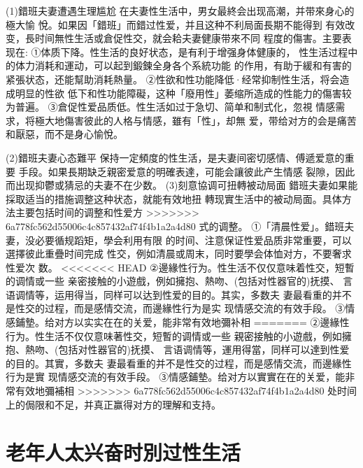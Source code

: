 \documentclass[12pt,UTF8]{ctexbook}
\begin{document}
(1)錯班夫妻遭遇生理尴尬
在夫妻性生活中，男女最終会出现高潮，并带來身心的極大愉
悅。如果因「錯班」而錯过性爱，并且这种不利局面長期不能得到
有效改变，長时间無性生活或倉促性交，就会耠夫妻健康带來不同
程度的傷害。主要表现在:
①体质下降。性生活的良好状态，是有利于增强身体健康的，
性生活过程中的体力消耗和運动，可以起到鍛鍊全身各个系統功能
的作用，有助于緩和有害的紧張状态，还能幫助消耗熱量。
②性欲和性功能降低·经常抑制性生活，将会造成明显的性欲
低下和性功能障礙，这种「廢用性」萎缩所造成的性能力的傷害较
为普遍。
③倉促性爱品质低。性生活如过于急切、简单和制式化，忽視
情感需求，将極大地傷害彼此的人格与情感，雖有「性」，却無
爱，带给对方的会是痛苦和厭惡，而不是身心愉悅。

(2)錯班夫妻心态難平
保持一定頻度的性生活，是夫妻间密切感情、傅遞爱意的重要
手段。如果長期缺乏親密爱意的明確表達，可能会讓彼此产生情感
裂隙，因此而出现抑鬱或猜忌的夫妻不在少数。
(3)刻意協调可扭轉被动局面
錯班夫妻如果能採取适当的措施调整这种状态，就能有效地扭
轉现實生活中的被动局面。具体方法主要包括时间的调整和性爱方
>>>>>>> 6a778fc562d55006c4c857432af74f4b1a2a4d80
式的调整。
①「清晨性爱」。錯班夫妻，没必要循规蹈矩，學会利用有限
的时间、注意保证性爱品质非常重要，可以選擇彼此重疊时间完成
性交，例如清晨或周末，同时要學会体恤对方，不要奢求性爱次
数。
<<<<<<< HEAD
②邊緣性行为。性生活不仅仅意味着性交，短暫的调情或一些
亲密接触的小遊戲，例如擁抱、熱吻、(包括对性器官的)抚摸、
言语调情等，运用得当，同样可以达到性爱的目的。其实，多数夫
妻最看重的并不是性交的过程，而是感情交流，而邊緣性行为是实
现情感交流的有效手段。
③情感鋪墊。给对方以实实在在的关爱，能非常有效地彌补相
=======
②邊緣性行为。性生活不仅仅意味著性交，短暫的调情或一些
親密接触的小遊戲，例如擁抱、熱吻、(包括对性器官的)抚摸、
言语调情等，運用得當，同样可以達到性爱的目的。其實，多数夫
妻最看重的并不是性交的过程，而是感情交流，而邊緣性行为是實
现情感交流的有效手段。
③情感鋪墊。给对方以實實在在的关爱，能非常有效地彌補相
>>>>>>> 6a778fc562d55006c4c857432af74f4b1a2a4d80
处时间上的侷限和不足，并真正赢得对方的理解和支持。


\section{老年人太兴奋时別过性生活}
\end{document}
